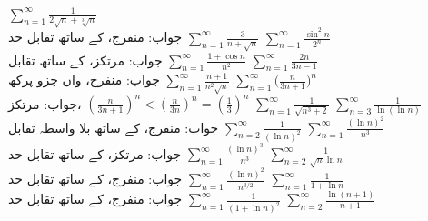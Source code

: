 $\sum\limits_{n=1}^{\infty}\frac{1}{2\sqrt{n}+\sqrt[3]{n}}$\\
جواب:\quad
منفرج، کے ساتھ تقابل حد
$\sum\limits_{n=1}^{\infty}\frac{3}{n+\sqrt{n}}$
$\sum\limits_{n=1}^{\infty}\frac{\sin^2n}{2^n}$\\
جواب:\quad
مرتکز،  کے ساتھ تقابل
$\sum\limits_{n=1}^{\infty}\frac{1+\cos n}{n^2}$
$\sum\limits_{n=1}^{\infty}\frac{2n}{3n-1}$\\
جواب:\quad
منفرج،  واں جزو پرکھ
$\sum\limits_{n=1}^{\infty}\frac{n+1}{n^2\sqrt{n}}$
$\sum\limits_{n=1}^{\infty}\big(\frac{n}{3n+1}\big)^n$\\
جواب:\quad
مرتکز،
$(\tfrac{n}{3n+1})^n<(\tfrac{n}{3n})^n=(\tfrac{1}{3})^n$
$\sum\limits_{n=1}^{\infty}\frac{1}{\sqrt{n^3+2}}$
$\sum\limits_{n=3}^{\infty}\frac{1}{\ln(\ln n)}$\\
جواب:\quad
منفرج،  کے ساتھ بلا واسطہ تقابل
$\sum\limits_{n=2}^{\infty}\frac{1}{(\ln n)^2}$
$\sum\limits_{n=1}^{\infty}\frac{(\ln n)^2}{n^3}$\\
جواب:\quad
مرتکز،  کے ساتھ تقابل حد
$\sum\limits_{n=1}^{\infty}\frac{(\ln n)^3}{n^3}$
$\sum\limits_{n=2}^{\infty}\frac{1}{\sqrt{n}\ln n}$\\
جواب:\quad
منفرج،  کے ساتھ تقابل حد
$\sum\limits_{n=1}^{\infty}\frac{(\ln n)^2}{n^{3/2}}$
$\sum\limits_{n=1}^{\infty}\frac{1}{1+\ln n}$\\
جواب:\quad
منفرج، کے ساتھ تقابل حد
$\sum\limits_{n=1}^{\infty}\frac{1}{(1+\ln n)^2}$
$\sum\limits_{n=2}^{\infty}\frac{\ln(n+1)}{n+1}$\\
